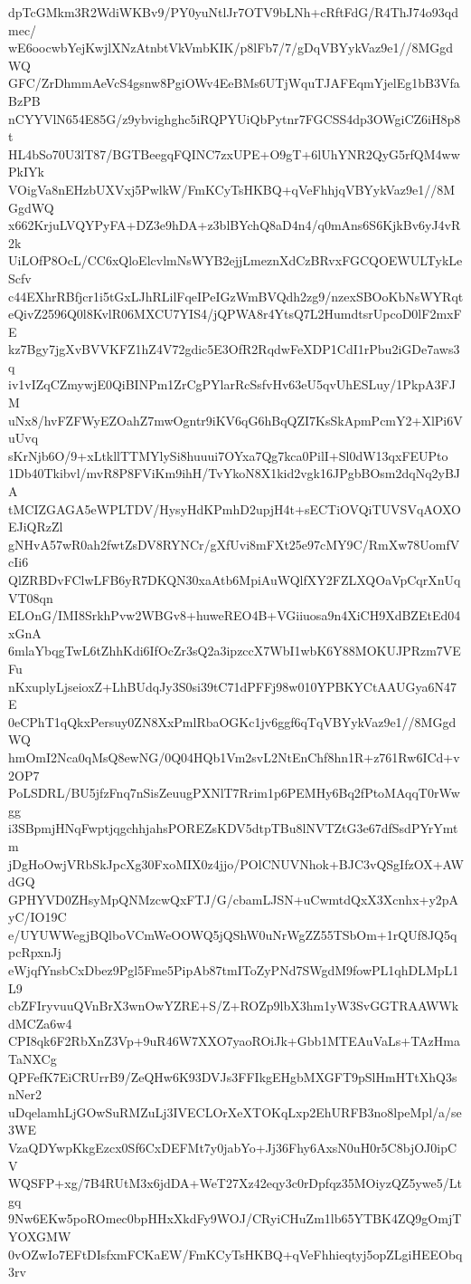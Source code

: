 dpTcGMkm3R2WdiWKBv9/PY0yuNtlJr7OTV9bLNh+cRftFdG/R4ThJ74o93qdmec/
wE6oocwbYejKwjlXNzAtnbtVkVmbKIK/p8lFb7/7/gDqVBYykVaz9e1//8MGgdWQ
GFC/ZrDhmmAeVcS4gsnw8PgiOWv4EeBMs6UTjWquTJAFEqmYjelEg1bB3VfaBzPB
nCYYVlN654E85G/z9ybvighghc5iRQPYUiQbPytnr7FGCSS4dp3OWgiCZ6iH8p8t
HL4bSo70U3lT87/BGTBeegqFQINC7zxUPE+O9gT+6lUhYNR2QyG5rfQM4wwPkIYk
VOigVa8nEHzbUXVxj5PwlkW/FmKCyTsHKBQ+qVeFhhjqVBYykVaz9e1//8MGgdWQ
x662KrjuLVQYPyFA+DZ3e9hDA+z3blBYchQ8aD4n4/q0mAns6S6KjkBv6yJ4vR2k
UiLOfP8OcL/CC6xQloElcvlmNsWYB2ejjLmeznXdCzBRvxFGCQOEWULTykLeScfv
c44EXhrRBfjcr1i5tGxLJhRLilFqeIPeIGzWmBVQdh2zg9/nzexSBOoKbNsWYRqt
eQivZ2596Q0l8KvlR06MXCU7YIS4/jQPWA8r4YtsQ7L2HumdtsrUpcoD0lF2mxFE
kz7Bgy7jgXvBVVKFZ1hZ4V72gdic5E3OfR2RqdwFeXDP1CdI1rPbu2iGDe7aws3q
iv1vIZqCZmywjE0QiBINPm1ZrCgPYlarRcSsfvHv63eU5qvUhESLuy/1PkpA3FJM
uNx8/hvFZFWyEZOahZ7mwOgntr9iKV6qG6hBqQZI7KsSkApmPcmY2+XlPi6VuUvq
sKrNjb6O/9+xLtkllTTMYlySi8huuui7OYxa7Qg7kca0PilI+Sl0dW13qxFEUPto
1Db40Tkibvl/mvR8P8FViKm9ihH/TvYkoN8X1kid2vgk16JPgbBOsm2dqNq2yBJA
tMCIZGAGA5eWPLTDV/HysyHdKPmhD2upjH4t+sECTiOVQiTUVSVqAOXOEJiQRzZl
gNHvA57wR0ah2fwtZsDV8RYNCr/gXfUvi8mFXt25e97cMY9C/RmXw78UomfVcIi6
QlZRBDvFClwLFB6yR7DKQN30xaAtb6MpiAuWQlfXY2FZLXQOaVpCqrXnUqVT08qn
ELOnG/IMI8SrkhPvw2WBGv8+huweREO4B+VGiiuosa9n4XiCH9XdBZEtEd04xGnA
6mlaYbqgTwL6tZhhKdi6IfOcZr3sQ2a3ipzccX7WbI1wbK6Y88MOKUJPRzm7VEFu
nKxuplyLjseioxZ+LhBUdqJy3S0si39tC71dPFFj98w010YPBKYCtAAUGya6N47E
0eCPhT1qQkxPersuy0ZN8XxPmlRbaOGKc1jv6ggf6qTqVBYykVaz9e1//8MGgdWQ
hmOmI2Nca0qMsQ8ewNG/0Q04HQb1Vm2svL2NtEnChf8hn1R+z761Rw6ICd+v2OP7
PoLSDRL/BU5jfzFnq7nSisZeuugPXNlT7Rrim1p6PEMHy6Bq2fPtoMAqqT0rWwgg
i3SBpmjHNqFwptjqgchhjahsPOREZsKDV5dtpTBu8lNVTZtG3e67dfSsdPYrYmtm
jDgHoOwjVRbSkJpcXg30FxoMIX0z4jjo/POlCNUVNhok+BJC3vQSgIfzOX+AWdGQ
GPHYVD0ZHsyMpQNMzcwQxFTJ/G/cbamLJSN+uCwmtdQxX3Xcnhx+y2pAyC/IO19C
e/UYUWWegjBQlboVCmWeOOWQ5jQShW0uNrWgZZ55TSbOm+1rQUf8JQ5qpcRpxnJj
eWjqfYnsbCxDbez9Pgl5Fme5PipAb87tmIToZyPNd7SWgdM9fowPL1qhDLMpL1L9
cbZFIryvuuQVnBrX3wnOwYZRE+S/Z+ROZp9lbX3hm1yW3SvGGTRAAWWkdMCZa6w4
CPI8qk6F2RbXnZ3Vp+9uR46W7XXO7yaoROiJk+Gbb1MTEAuVaLs+TAzHmaTaNXCg
QPFefK7EiCRUrrB9/ZeQHw6K93DVJs3FFIkgEHgbMXGFT9pSlHmHTtXhQ3snNer2
uDqelamhLjGOwSuRMZuLj3IVECLOrXeXTOKqLxp2EhURFB3no8lpeMpl/a/se3WE
VzaQDYwpKkgEzcx0Sf6CxDEFMt7y0jabYo+Jj36Fhy6AxsN0uH0r5C8bjOJ0ipCV
WQSFP+xg/7B4RUtM3x6jdDA+WeT27Xz42eqy3c0rDpfqz35MOiyzQZ5ywe5/Ltgq
9Nw6EKw5poROmec0bpHHxXkdFy9WOJ/CRyiCHuZm1lb65YTBK4ZQ9gOmjTYOXGMW
0vOZwIo7EFtDIsfxmFCKaEW/FmKCyTsHKBQ+qVeFhhieqtyj5opZLgiHEEObq3rv
